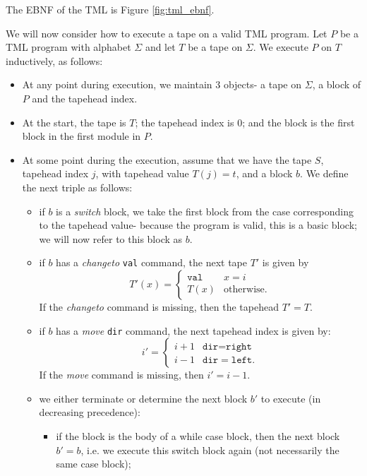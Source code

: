 \documentclass{article}
\theoremstyle{definition}
\begin{document}
    The EBNF of the TML is Figure \ref{fig:tml_ebnf}.
    
    We will now consider how to execute a tape on a valid TML program. Let $P$ be a TML program with alphabet $\Sigma$ and let $T$ be a tape on $\Sigma$. We execute $P$ on $T$ inductively, as follows:
    \begin{itemize}
        \item At any point during execution, we maintain 3 objects- a tape on $\Sigma$, a block of $P$ and the tapehead index. 
        \item At the start, the tape is $T$; the tapehead index is $0$; and the block is the first block in the first module in $P$. 
        \item At some point during the execution, assume that we have the tape $S$, tapehead index $j$, with tapehead value $T(j) = t$, and a block $b$. We define the next triple as follows:
        \begin{itemize}
            \item if $b$ is a \textit{switch} block, we take the first block from the case corresponding to the tapehead value- because the program is valid, this is a basic block; we will now refer to this block as $b$.
            \item if $b$ has a \textit{changeto} \texttt{val} command, the next tape $T'$ is given by 
            \[T'(x) = \begin{cases}
                \texttt{val} & x = i \\
                T(x) & \text{otherwise}.
            \end{cases}\]
            If the \textit{changeto} command is missing, then the tapehead $T' = T$.
            \item if $b$ has a \textit{move} \texttt{dir} command, the next tapehead index is given by:
            \[i' = \begin{cases}
                i+1 & \texttt{dir} = \texttt{right} \\
                i-1 & \texttt{dir} = \texttt{left}.
            \end{cases}\]
            If the \textit{move} command is missing, then $i' = i-1$.
            \item we either terminate or determine the next block $b'$ to execute (in decreasing precedence):
            \begin{itemize}
                \item if the block is the body of a while case block, then the next block $b' = b$, i.e. we execute this switch block again (not necessarily the same case block);

\end{itemize}
\end{itemize}
\end{itemize}
\end{document}
